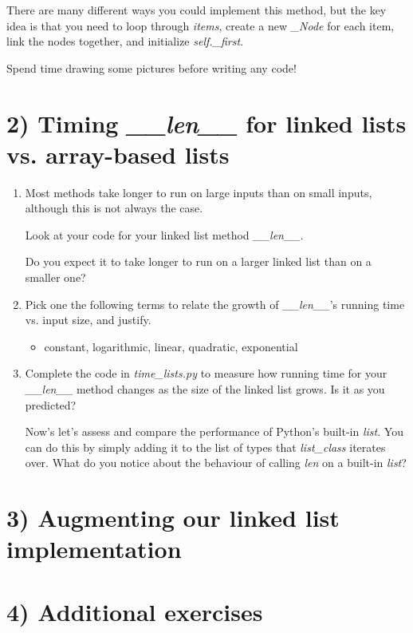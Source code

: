 \documentclass[12pt]{article}
\begin{document}
\begin{enumerate}[1.]
    \bigskip

    There are many different ways you could implement this method, but the key idea
    is that you need to loop through \textit{items}, create a new \textit{\_Node} for each
    item, link the nodes together, and initialize \textit{self.\_first}.

    \bigskip

    Spend time drawing some pictures before writing any code!

\end{enumerate}

\section*{2) Timing \textit{\_\_len\_\_} for linked lists vs. array-based lists}

\begin{enumerate}[1.]
    \item Most methods take longer to run on large inputs than on small inputs,
    although this is not always the case.

    \bigskip

    Look at your code for your linked list method \textit{\_\_len\_\_}.

    Do you expect it to take longer to run on a larger
    linked list than on a smaller one?

    \item Pick one the following terms to relate the growth of \textit{\_\_len\_\_}'s
    running time vs. input size, and justify.
    \begin{itemize}
        \item constant, logarithmic, linear, quadratic, exponential
    \end{itemize}

    \item Complete the code in \textit{time\_lists.py} to measure how running
    time for your \textit{\_\_len\_\_} method changes as the size of the linked
    list grows. Is it as you predicted?

    \bigskip

    Now’s let’s assess and compare the performance of Python’s built-in \textit{list}.
    You can do this by simply adding it to the list of types that \textit{list\_class}
    iterates over. What do you notice about the behaviour of calling \textit{len} on
    a built-in \textit{list}?

\end{enumerate}

\section*{3) Augmenting our linked list implementation}

\section*{4) Additional exercises}
\end{document}
